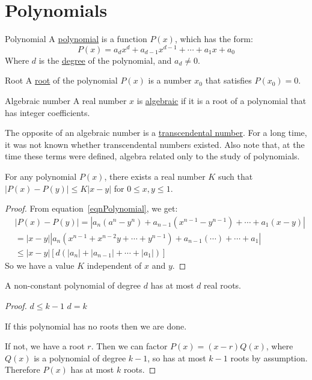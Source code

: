 \documentclass[../Main.tex]{subfiles}
\begin{document}
\section{Polynomials}
\begin{definition}{Polynomial}
    A \underline{polynomial} is a function $P(x)$, which has the form:
    \begin{equation}
        P(x) = a_d x^d + a_{d-1} x^{d-1} + \cdots + a_1 x + a_0
        \label{eqnPolynomial}
    \end{equation}
    Where $d$ is the \underline{degree} of the polynomial, and $a_d \neq 0$.
\end{definition}
\begin{definition}{Root}
    A \underline{root} of the polynomial $P(x)$ is a number $x_0$ that satisfies $P(x_0) = 0$.
\end{definition}
\begin{definition}{Algebraic number}
    A real number $x$ is \underline{algebraic} if it is a root of a polynomial that has integer coefficients.
\end{definition}
The opposite of an algebraic number is a \underline{transcendental number}. For a long time, it was not known whether transcendental numbers existed. Also note that, at the time these terms were defined, algebra related only to the study of polynomials.
\begin{lemma}
    For any polynomial $P(x)$, there exists a real number $K$ such that $|P(x) - P(y)| \leq K|x - y|$ for $0 \leq x, y \leq 1$.
    \label{lemPolynomialBounds}
\end{lemma}
\begin{proof}
    From equation~\ref{eqnPolynomial}, we get:
    \begin{align*}
        &|P(x) - P(y)| = |a_n(a^n - y^n) + a_{n-1}(x^{n-1} - y^{n-1}) + \cdots + a_1(x-y)| \\
        &= |x - y| |a_n(x^{n-1} + x^{n-2} y + \cdots + y^{n-1}) + a_{n-1} (\cdots) + \cdots + a_1| \\
        &\leq |x - y| \left[d(|a_n| + |a_{n-1}| + \cdots + |a_1|)\right]
    \end{align*}
    So we have a value $K$ independent of $x$ and $y$.
\end{proof}
\begin{theorem}
    A non-constant polynomial of degree $d$ has at most $d$ real roots.
    \label{thmFundamentalAlgebra}
\end{theorem}
\begin{proof}
    {$d \leq k - 1$}{}
    {$d = k$}{
        If this polynomial has no roots then we are done.\par
        If not, we have a root $r$. Then we can factor $P(x) = (x - r)Q(x)$, where $Q(x)$ is a polynomial of degree $k - 1$, so has at most $k - 1$ roots by assumption. Therefore $P(x)$ has at most $k$ roots.
    }
\end{proof}
\end{document}

